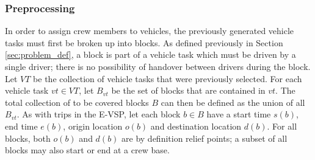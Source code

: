 \documentclass[]{article}
\begin{document}
\subsubsection{Preprocessing}
In order to assign crew members to vehicles, the previously generated vehicle tasks must first be broken up into blocks. As defined previously in Section \ref{sec:problem_def}, a block is part of a vehicle task which must be driven by a single driver; there is no possibility of handover between drivers during the block. Let $VT$ be the collection of vehicle tasks that were previously selected. For each vehicle task $vt \in VT$, let $B_{vt}$ be the set of blocks that are contained in $vt$. The total collection of to be covered blocks $B$ can then be defined as the union of all $B_{vt}$. As with trips in the E-VSP, let each block $b \in B$ have a start time $s(b)$, end time $e(b)$, origin location $o(b)$ and destination location $d(b)$. For all blocks, both $o(b)$ and $d(b)$ are by definition relief points; a subset of all blocks may also start or end at a crew base.
\end{document}
